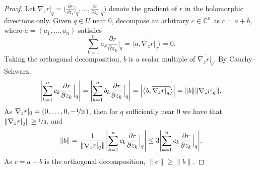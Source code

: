 \documentclass[12pt,openany]{book}
\newcommand{\avoidbreak}{\postdisplaypenalty=100}
\newcommand{\blinnprod}[2]{\bigl\langle #1 , #2 \bigr\rangle}
\newcommand{\snorm}[1]{\lVert {#1} \rVert}
\newcommand{\Babs}[1]{\Bigl\lvert {#1} \Bigr\rvert}
\newcommand{\BBabs}[1]{\Biggl\lvert {#1} \Biggr\rvert}
\newcommand{\abs}[1]{\left\lvert {#1} \right\rvert}
\newcommand{\C}{{\mathbb{C}}}
\theoremstyle{plain}
\theoremstyle{remark}
\theoremstyle{definition}
\theoremstyle{exercise}
\theoremstyle{example}
\begin{document}
\begin{proof}
Let $\nabla_z r|_q =
\bigl(
\frac{\partial r}{\partial z_1}\big|_q,\ldots,
\frac{\partial r}{\partial z_n}\big|_q \bigr)$ denote the gradient of $r$ in
the holomorphic directions only.
Given $q \in U$ near $0$,
decompose an arbitrary $c \in \C^n$ as $c = a+b$, where $a = (a_1,\ldots,a_n)$
satisfies
\begin{equation*}
\sum_{k=1}^n
a_k \frac{\partial r}{\partial z_k} \Big|_q =
\blinnprod{a}{\overline{\nabla_z r|_q}}
=
0 .
\end{equation*}
Taking the orthogonal decomposition, $b$ is a scalar multiple of
$\overline{\nabla_z r|_q}$.
By Cauchy--Schwarz,
\begin{equation*}
\BBabs{\sum_{k=1}^n c_k \frac{\partial r}{\partial z_k} \Big|_q}
=
\BBabs{\sum_{k=1}^n b_k \frac{\partial r}{\partial z_k} \Big|_q}
=
\Babs{\blinnprod{b}{\overline{\nabla_z r|_q}}}
=
\snorm{b} \snorm {\nabla_z r|_q} .
\end{equation*}
As $\nabla_z r|_0 = (0,\ldots,0,-\nicefrac{1}{2i})$, then for $q$ sufficiently near $0$ we have that
$\snorm{\nabla_z r|_q} \geq \nicefrac{1}{3}$, and
\begin{equation*}
\snorm{b} =
\frac{1}{\snorm
{\nabla_z r|_q}}
\BBabs{\sum_{k=1}^n c_k \frac{\partial r}{\partial z_k} \Big|_q}
\leq
3 \BBabs{\sum_{k=1}^n c_k \frac{\partial r}{\partial z_k} \Big|_q}
.
\avoidbreak
\end{equation*}
As $c = a+b$ is the orthogonal decomposition, $\snorm{c} \geq \snorm{b}$.


\end{proof}
\end{document}
